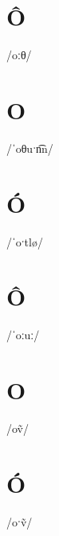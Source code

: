 \documentclass[10pt,a4paper,twoside]{book}
\begin{document}
\section*{Ô}

\begin{multicols}{3}
 {/oːθ/} {}
\end{multicols}

\section*{O}

\begin{multicols}{3}
 {/ˈoθuˑn͡n/} {}
\end{multicols}

\section*{Ó}

\begin{multicols}{3}
 {/ˈoˑtlø/} {}
\end{multicols}

\section*{Ô}

\begin{multicols}{3}
 {/ˈoːuː/} {}
\end{multicols}

\section*{O}

\begin{multicols}{3}
 {/oṽ/} {}
\end{multicols}

\section*{Ó}

\begin{multicols}{3}
 {/oˑṽ/} {}
\end{multicols}
\end{document}
